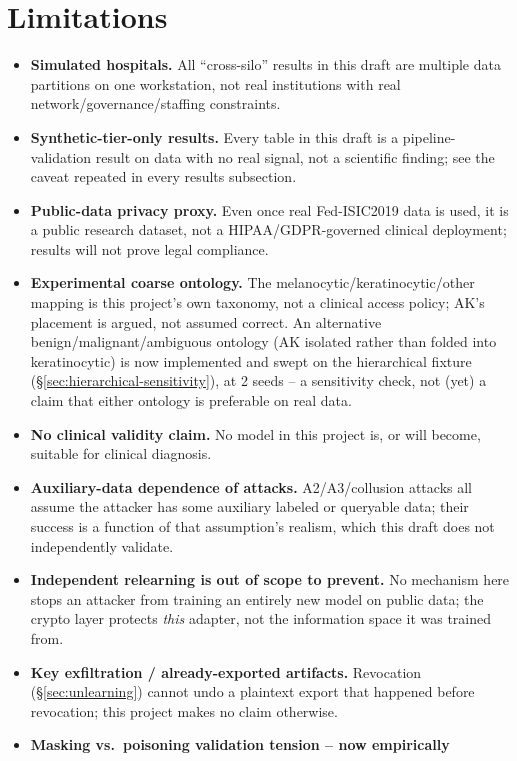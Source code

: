 \documentclass[11pt]{article}
\begin{document}
\section{Limitations}
\label{sec:limitations}
\begin{itemize}[nosep]
\item \textbf{Simulated hospitals.} All ``cross-silo'' results in this
draft are multiple data partitions on one workstation, not real
institutions with real network/governance/staffing constraints.
\item \textbf{Synthetic-tier-only results.} Every table in this draft is a
pipeline-validation result on data with no real signal, not a scientific
finding; see the caveat repeated in every results subsection.
\item \textbf{Public-data privacy proxy.} Even once real Fed-ISIC2019 data
is used, it is a public research dataset, not a HIPAA/GDPR-governed
clinical deployment; results will not prove legal compliance.
\item \textbf{Experimental coarse ontology.} The melanocytic/keratinocytic/other
mapping is this project's own taxonomy, not a clinical access policy;
AK's placement is argued, not assumed correct. An alternative
benign/malignant/ambiguous ontology (AK isolated rather than folded into
keratinocytic) is now implemented and swept on the hierarchical fixture
(\S\ref{sec:hierarchical-sensitivity}), at 2 seeds -- a sensitivity check,
not (yet) a claim that either ontology is preferable on real data.
\item \textbf{No clinical validity claim.} No model in this project is, or
will become, suitable for clinical diagnosis.
\item \textbf{Auxiliary-data dependence of attacks.} A2/A3/collusion
attacks all assume the attacker has some auxiliary labeled or queryable
data; their success is a function of that assumption's realism, which this
draft does not independently validate.
\item \textbf{Independent relearning is out of scope to prevent.} No
mechanism here stops an attacker from training an entirely new model on
public data; the crypto layer protects \emph{this} adapter, not the
information space it was trained from.
\item \textbf{Key exfiltration / already-exported artifacts.} Revocation
(\S\ref{sec:unlearning}) cannot undo a plaintext export that happened
before revocation; this project makes no claim otherwise.
\item \textbf{Masking vs.\ poisoning validation tension -- now empirically
}
\end{itemize}
\end{document}
